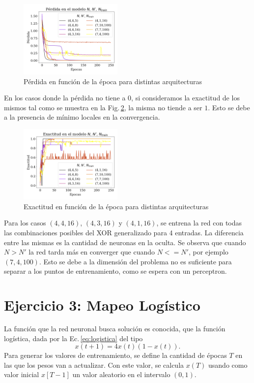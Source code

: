 \begin{figure}[H]
	\centering
	\includegraphics[width=0.45\textwidth]{../Graficos/ejer_2_los.png}
	\caption{Pérdida en función de la época para distintas arquitecturas}
	\label{fig:XOR_N_los}
\end{figure}

En los casos donde la pérdida no tiene a $0$, si consideramos la exactitud de los mismos tal como se muestra en la Fig.\,\ref{fig:XOR_N_acc}, la misma no tiende a ser $1$. Esto se debe a la presencia de mínimo locales en la convergencia.
\begin{figure}[H]
	\centering
	\includegraphics[width=0.45\textwidth]{../Graficos/ejer_2_acc.png}
	\caption{Exactitud en función de la época para distintas arquitecturas}
	\label{fig:XOR_N_acc}
\end{figure}
 Para los casos   $(4,4,16)$, $(4,3,16)$ y $(4,1,16)$, se entrena la red con todas las combinaciones posibles del XOR generalizado para 4 entradas. La diferencia entre las mismas es la cantidad de neuronas en la oculta. Se observa que cuando $N>N'$ la red tarda más en converger que cuando $N<=N'$, por ejemplo $(7,4,100)$. Esto se debe a la dimensión del problema no es suficiente para separar a los puntos de entrenamiento, como se espera con un perceptron.

\section*{Ejercicio 3: Mapeo Logístico }

La función que la red neuronal busca solución es conocida, que la función logística, dada por la Ec.\,\ref{eq:logistica} del tipo 
\begin{equation}
	x(t+1) = 4x(t)(1-x(t)).
	\label{eq:logistica}
\end{equation}
Para generar los valores de entrenamiento, se define la cantidad de épocas $T$ en las que los pesos van a actualizar. Con este valor, se calcula $x(T)$ usando como valor inicial $x[T-1]$ un valor aleatorio en el intervalo $(0,1)$.


